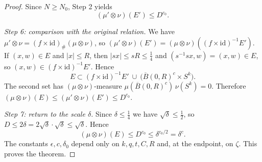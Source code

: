 \begin{proof}
Since $N\ge N_0$, Step 2 yields
\[
 (\mu'\otimes\nu)(E')\le D^{c_0}.
\]

\emph{Step 6: comparison with the original relation.} We have $\mu'\otimes\nu=(f\times\mathrm{id})_\#(\mu\otimes\nu)$, so $(\mu'\otimes\nu)(E')=(\mu\otimes\nu)((f\times\mathrm{id})^{-1}E')$. If $(x,w)\in E$ and $|x|\le R$, then $|sx|\le sR\le\frac14$ and $(s^{-1}sx,w)=(x,w)\in E$, so $(x,w)\in(f\times\mathrm{id})^{-1}E'$. Hence
\[
 E\subset (f\times\mathrm{id})^{-1}E'\ \cup\ \bigl(\overline B(0,R)^c\times S^k\bigr).
\]
The second set has $(\mu\otimes\nu)$-measure $\mu(\overline B(0,R)^c)\,\nu(S^k)=0$. Therefore $(\mu\otimes\nu)(E)\le(\mu'\otimes\nu)(E')\le D^{c_0}$.

\emph{Step 7: return to the scale $\delta$.} Since $\delta\le\frac14$ we have $\sqrt\delta\le\frac12$, so $D\le2\delta=2\sqrt\delta\cdot\sqrt\delta\le\sqrt\delta$. Hence
\[
 (\mu\otimes\nu)(E)\le D^{c_0}\le\delta^{c_0/2}=\delta^{c}.
\]
The constants $\epsilon,c,\delta_0$ depend only on $k,q,t,C,R$ and, at the endpoint, on $\zeta$. This proves the theorem.
\end{proof}
